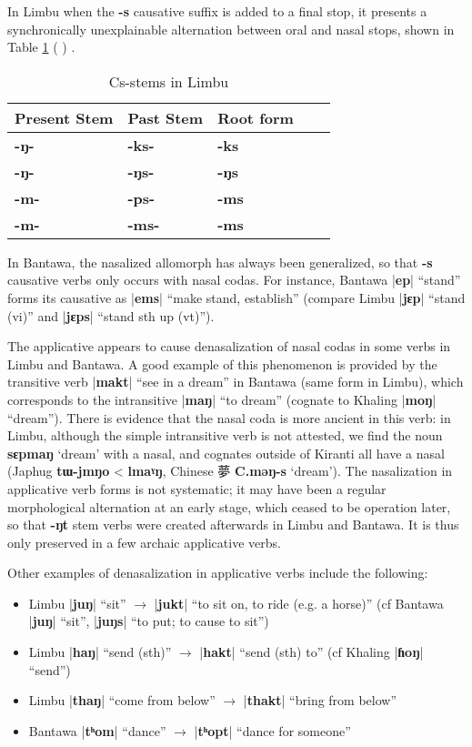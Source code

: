 \documentclass[oldfontcommands,oneside,a4paper,11pt]{article}
\newcommand{\ipa}[1]{\textbf{{\phon\mbox{#1}}}} %
\newcommand{\zh}[1]{{\cn #1}}
\newcommand{\dhatu}[2]{|\ipa{#1}| ``#2''}
\begin{document}
In Limbu when the \ipa{-s} causative suffix is added to a final stop, it presents a synchronically unexplainable alternation between oral and nasal stops, shown in Table \ref{tab:Cs.limbu} (\citealt{driem87} \citealt[xiii]{michailovsky02dico}) .

\begin{table}[H]
\caption{Cs-stems in Limbu} \centering \label{tab:Cs.limbu}
\begin{tabular}{lllll}
\toprule
Present Stem & Past Stem & Root form \\
\midrule
\ipa{-ŋ-} & \ipa{-ks-} & \ipa{-ks} \\
\ipa{-ŋ-} & \ipa{-ŋs-} & \ipa{-ŋs} \\
\ipa{-m-} & \ipa{-ps-} & \ipa{-ms} \\
\ipa{-m-} & \ipa{-ms-} & \ipa{-ms} \\
\bottomrule
\end{tabular}
\end{table} 

In Bantawa, the nasalized allomorph has always been generalized, so that \ipa{-s} causative verbs only occurs with nasal codas. For instance, Bantawa \dhatu{ep}{stand} forms its causative as \dhatu{ems}{make stand, establish} (compare Limbu \dhatu{jɛp}{stand (vi)}  and \dhatu{jɛps}{stand sth up (vt)}).

The applicative appears to cause denasalization of nasal codas in some verbs in Limbu and Bantawa. A good example of this phenomenon is provided by the transitive verb \dhatu{makt}{see in a dream}	in Bantawa (same form in Limbu), which corresponds to the intransitive \dhatu{maŋ}{to dream} (cognate to Khaling \dhatu{moŋ}{dream}). There is evidence that the nasal coda is more ancient in this verb: in Limbu, although the simple intransitive verb is not attested, we find the noun \ipa{sɛpmaŋ} `dream' with a nasal, and cognates outside of Kiranti all have a nasal (Japhug \ipa{tɯ-jmŋo} < \ipa{lmaˠŋ}, Chinese \zh{夢} \ipa{C.məŋ-s} `dream'). The nasalization in applicative verb forms is not systematic; it may have been a regular morphological alternation at an early stage, which ceased to be operation later, so that \ipa{-ŋt} stem verbs were created afterwards in Limbu and Bantawa. It is thus only preserved in a few archaic applicative verbs.


Other examples of denasalization in applicative verbs include the following:

\begin{itemize}
\item Limbu \dhatu{juŋ}{sit} $\rightarrow $ \dhatu{jukt}{to sit on, to ride (e.g. a horse)} (cf Bantawa \dhatu{juŋ}{sit}, \dhatu{juŋs}{to put; to cause to sit})
\item Limbu \dhatu{haŋ}{send (sth)} $\rightarrow $ \dhatu{hakt}{send (sth) to} (cf Khaling \dhatu{ɦoŋ}{send})
\item Limbu \dhatu{thaŋ}{come from below} $\rightarrow $ \dhatu{thakt}{bring from below}
\item Bantawa \dhatu{tʰom}{dance} $\rightarrow $ \dhatu{tʰopt}{dance for someone}
\end{itemize}
 
\end{document}
